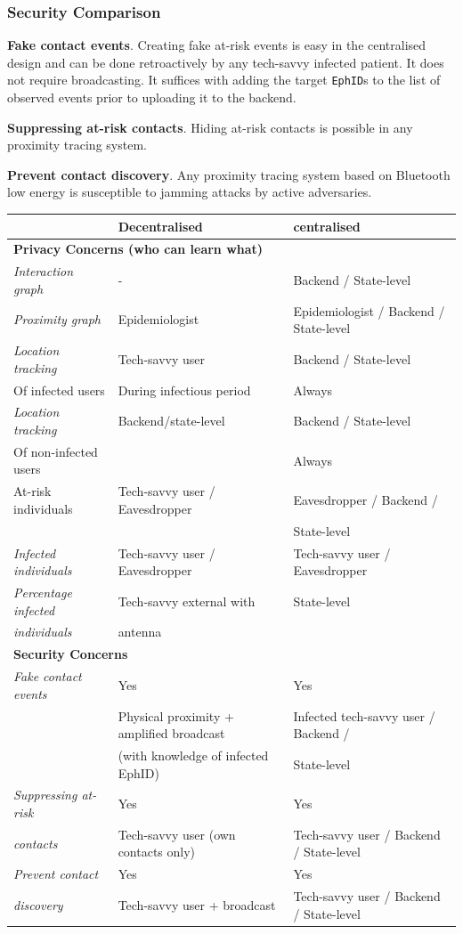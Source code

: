 \documentclass[12pt,a4paper]{article}
\begin{document}
\subsubsection*{Security Comparison}
\textbf{Fake contact events}. Creating fake at-risk events is easy in the centralised design and can be done retroactively by any tech-savvy infected patient. It does not require broadcasting. It suffices with adding the target \texttt{EphID}s to the list of observed events prior to uploading it to the backend.

\textbf{Suppressing at-risk contacts}. Hiding at-risk contacts is possible in any proximity tracing system.

\textbf{Prevent contact discovery}. Any proximity tracing system based on Bluetooth low energy is susceptible to jamming attacks by active adversaries.
\begin{table}[H]
\centering
\begin{tabular}{p{4cm}p{5cm}p{5cm}}\hline
 & \textbf{Decentralised} & \textbf{centralised}\\ \hline
 \multicolumn{3}{l}{\textbf{Privacy Concerns (who can learn what)}}\\
 \textit{Interaction graph} & - & Backend / State-level \\
 \textit{Proximity graph} & Epidemiologist & Epidemiologist / Backend / State-level\\
\textit{Location tracking} & Tech-savvy user & Backend / State-level\\
\small Of infected users & \small During infectious period & Always \small \\
\textit{Location tracking} & Backend/state-level & Backend / State-level\\
\small Of non-infected users & & \small Always\\
At-risk individuals & Tech-savvy user / Eavesdropper & Eavesdropper / Backend /\\
 & & State-level\\
\textit{Infected individuals} & Tech-savvy user / Eavesdropper & Tech-savvy user / Eavesdropper\\
\textit{Percentage infected} & Tech-savvy external with & State-level\\
\textit{individuals} & antenna & \\ \hline
\multicolumn{3}{l}{\textbf{Security Concerns}}\\
\textit{Fake contact events} & Yes & Yes \\
 & \small Physical proximity + amplified broadcast & \small Infected tech-savvy user / Backend /\\
 & \small (with knowledge of infected EphID) & \small State-level\\
\textit{Suppressing at-risk} & Yes & Yes \\
\textit{contacts} & \small Tech-savvy user (own contacts only) & Tech-savvy user / Backend / State-level\\
\textit{Prevent contact} & Yes & Yes \\
\textit{discovery} & \small Tech-savvy user + broadcast & \small Tech-savvy user / Backend / State-level\\ \hline
\end{tabular}
\end{table}
\clearpage
\end{document}
